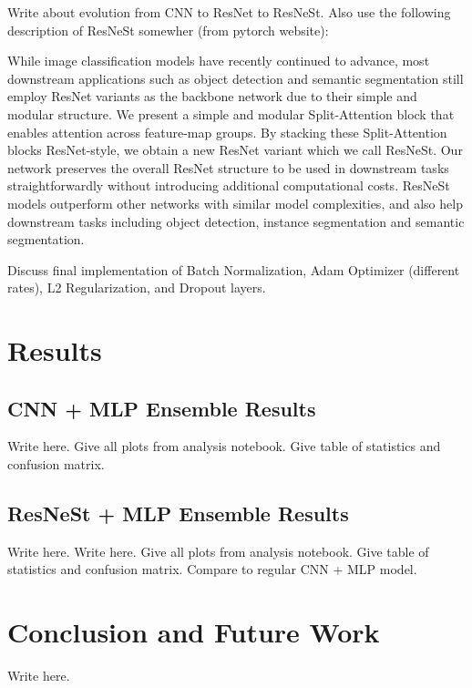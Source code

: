 \documentclass [MAS] {uclathes}
\begin{document}
Write about evolution from CNN to ResNet to ResNeSt. Also use the following description of ResNeSt somewher (from pytorch website):

While image classification models have recently continued to advance, most downstream applications such as object detection and semantic segmentation still employ ResNet variants as the backbone network due to their simple and modular structure. We present a simple and modular Split-Attention block that enables attention across feature-map groups. By stacking these Split-Attention blocks ResNet-style, we obtain a new ResNet variant which we call ResNeSt. Our network preserves the overall ResNet structure to be used in downstream tasks straightforwardly without introducing additional computational costs. ResNeSt models outperform other networks with similar model complexities, and also help downstream tasks including object detection, instance segmentation and semantic segmentation.

Discuss final implementation of Batch Normalization, Adam Optimizer (different rates), L2 Regularization, and Dropout layers.


\chapter{Results}

\section{CNN + MLP Ensemble Results}

Write here. Give all plots from analysis notebook. Give table of statistics and confusion matrix.

\section{ResNeSt + MLP Ensemble Results}

Write here. Write here. Give all plots from analysis notebook. Give table of statistics and confusion matrix. Compare to regular CNN + MLP model.


\chapter{Conclusion and Future Work}

Write here.



\end{document}
